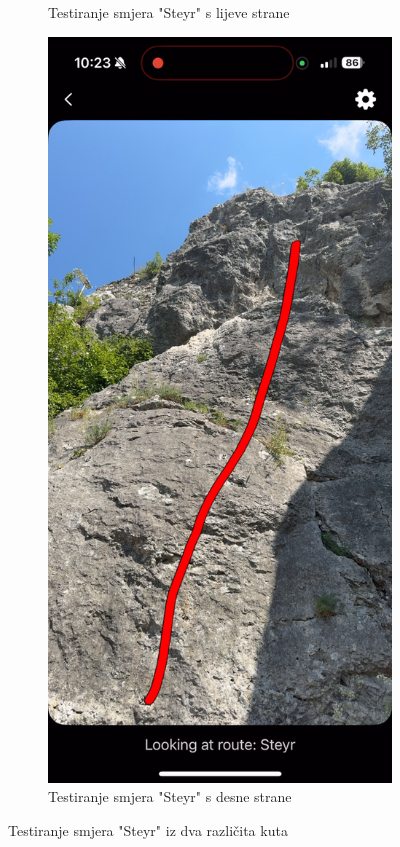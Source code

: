 \begin{figure}[H]
\begin{subfigure}[b]{0.45\textwidth}
        \caption{Testiranje smjera "Steyr" s lijeve strane}
        \label{fig:steyr_test_left_side}
    \end{subfigure}
    \hfill
    \begin{subfigure}[b]{0.45\textwidth}
        \centering
        \includegraphics[width=\textwidth]{images/testiranje/steyr_test_right_side.png}
        \caption{Testiranje smjera "Steyr" s desne strane}
        \label{fig:steyr_test_right_side}
    \end{subfigure}
    \caption{Testiranje smjera "Steyr" iz dva različita kuta}
    \label{fig:steyr_test_double}
\end{figure}

